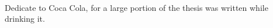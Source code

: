 \renewcommand{\baselinestretch}{2}
\small\normalsize
\hbox{\ }

\vspace{.5in}

\begin{center}
\large{Dedicate to Coca Cola, for a large portion of the thesis was written while drinking it.}
\end{center}
